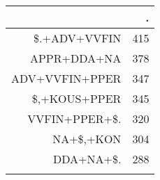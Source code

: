 \begin{tabular}{rr}
  \lsptoprule
 & . \\ 
  \midrule
\$.+ADV+VVFIN & 415 \\ 
  APPR+DDA+NA & 378 \\ 
  ADV+VVFIN+PPER & 347 \\ 
  \$,+KOUS+PPER & 345 \\ 
  VVFIN+PPER+\$. & 320 \\ 
  NA+\$,+KON & 304 \\ 
  DDA+NA+\$. & 288 \\ 
   \lspbottomrule
\end{tabular}
